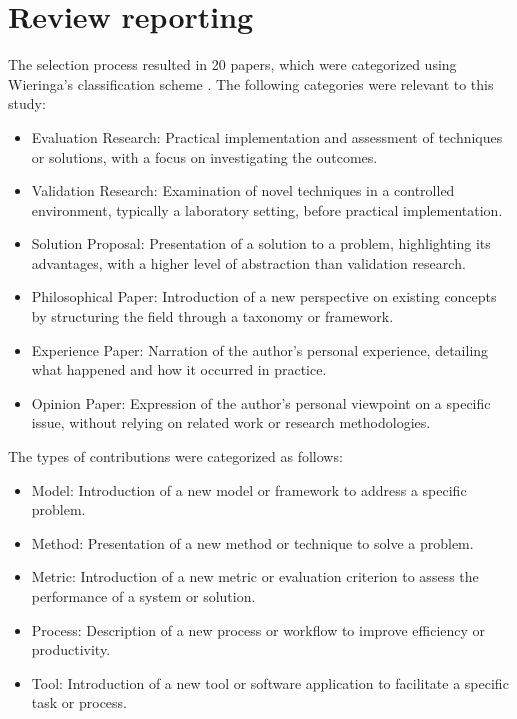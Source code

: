 \section{Review reporting}

The selection process resulted in 20 papers, which were categorized using Wieringa's classification scheme \cite{wieringa2006requirements}. The following categories were relevant to this study:


\begin{itemize}
    \item Evaluation Research: Practical implementation and assessment of techniques or solutions, with a focus on investigating the outcomes.
    \item Validation Research: Examination of novel techniques in a controlled environment, typically a laboratory setting, before practical implementation.
    \item Solution Proposal: Presentation of a solution to a problem, highlighting its advantages, with a higher level of abstraction than validation research.
    \item Philosophical Paper: Introduction of a new perspective on existing concepts by structuring the field through a taxonomy or framework.
    \item Experience Paper: Narration of the author's personal experience, detailing what happened and how it occurred in practice.
    \item Opinion Paper: Expression of the author's personal viewpoint on a specific issue, without relying on related work or research methodologies.
\end{itemize}

The types of contributions were categorized as follows:
\begin{itemize}
    \item Model: Introduction of a new model or framework to address a specific problem.
    \item Method: Presentation of a new method or technique to solve a problem.
    \item Metric: Introduction of a new metric or evaluation criterion to assess the performance of a system or solution.
    \item Process: Description of a new process or workflow to improve efficiency or productivity.
    \item Tool: Introduction of a new tool or software application to facilitate a specific task or process.
\end{itemize}

